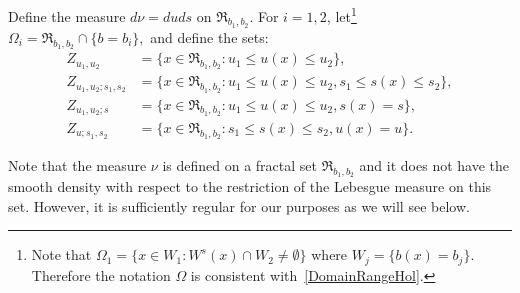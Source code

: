 \documentclass[AHL, Unicode, longabstracts,published]{cedram}
\newcommand{\Rect}{{\mathfrak{R}}}
\begin{document}
Define the measure $d\nu=du ds$ on $\Rect_{b_1, b_2}$. For $i = 1, 2$, let\footnote{Note that $\Omega_1=\{x\in W_1: W^s(x)\cap W_2\neq \emptyset\}$ where $W_j=\{b(x)=b_j\}.$ Therefore the notation $\Omega$ is consistent with~\eqref{DomainRangeHol}.}\\
$\Omega_i=\Rect_{b_1, b_2} \cap \{b=b_i\},$ and define the sets:
\begin{align*}
Z_{u_1, u_2}&=\{x\in \Rect_{b_1, b_2}: u_1\leq u(x) \leq u_2\},\\
Z_{u_1, u_2; s_1, s_2}&=\{x\in \Rect_{b_1, b_2}: u_1\leq u(x) \leq u_2, s_1\leq s(x) \leq s_2\},\\
Z_{u_1, u_2;s}&=\{x\in \Rect_{b_1, b_2}: u_1\leq u(x) \leq u_2, s(x)=s\},\\
Z_{u;s_1, s_2}&=\{x\in \Rect_{b_1, b_2}: s_1\leq s(x) \leq s_2, u(x)=u\}.
\end{align*}

Note that the measure $\nu$ is defined on a fractal set $\Rect_{b_1, b_2}$ and it does not have the smooth density with respect to the restriction of the Lebesgue measure on this set. However, it is sufficiently regular for our purposes as we will see below.
\end{document}
